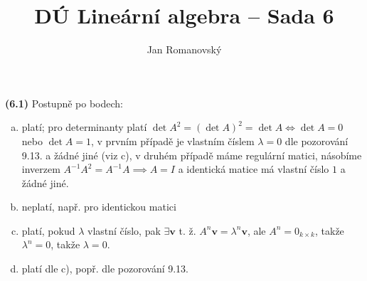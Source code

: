 \documentclass{article}
\title{DÚ Lineární algebra -- Sada 6}
\author{Jan Romanovský}
\begin{document}
\maketitle

\textbf{(6.1)} Postupně po bodech:
\begin{enumerate}[a)]
  \item platí; pro determinanty platí $\det A^2 = (\det A)^2 = \det A \iff \det A = 0$ nebo $\det A = 1$, v prvním případě je vlastním číslem $\lambda = 0$ dle pozorování 9.13. a žádné jiné (viz c), v druhém případě máme regulární matici, násobíme inverzem $A^{-1}A^2 = A^{-1}A \implies A = I$ a identická matice má vlastní číslo $1$ a žádné jiné.
  \item neplatí, např. pro identickou matici
  \item platí, pokud $\lambda$ vlastní číslo, pak $\exists \textbf{v}$ t. ž. $A^n \textbf{v} = \lambda^n \textbf{v}$, ale $A^n = 0_{k\times  k}$, takže $\lambda^n = 0$, takže $\lambda = 0$.
  \item platí dle c), popř. dle pozorování 9.13.
\end{enumerate}
\end{document}
